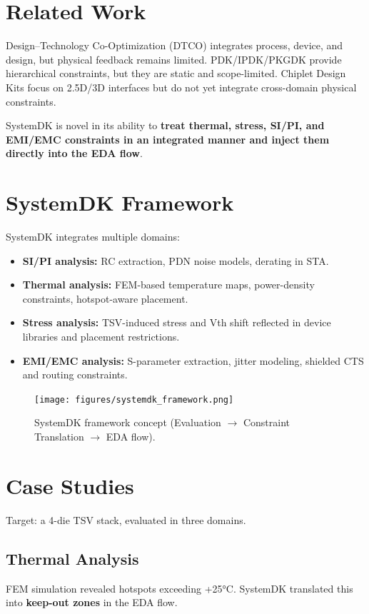 \documentclass[conference]{IEEEtran}
\begin{document}
\section{Related Work}
Design--Technology Co-Optimization (DTCO) integrates process, device, and design, but physical feedback remains limited.  
PDK/IPDK/PKGDK provide hierarchical constraints, but they are static and scope-limited.  
Chiplet Design Kits focus on 2.5D/3D interfaces but do not yet integrate cross-domain physical constraints.  

SystemDK is novel in its ability to \textbf{treat thermal, stress, SI/PI, and EMI/EMC constraints in an integrated manner and inject them directly into the EDA flow}.

\section{SystemDK Framework}
SystemDK integrates multiple domains:
\begin{itemize}
  \item \textbf{SI/PI analysis:} RC extraction, PDN noise models, derating in STA.
  \item \textbf{Thermal analysis:} FEM-based temperature maps, power-density constraints, hotspot-aware placement.
  \item \textbf{Stress analysis:} TSV-induced stress and Vth shift reflected in device libraries and placement restrictions.
  \item \textbf{EMI/EMC analysis:} S-parameter extraction, jitter modeling, shielded CTS and routing constraints.
\end{itemize}

\begin{figure}[htbp]
  \centering
  \texttt{[image: figures/systemdk\_framework.png]}
  \caption{SystemDK framework concept (Evaluation $\rightarrow$ Constraint Translation $\rightarrow$ EDA flow).}
  \label{fig:framework}
\end{figure}

\section{Case Studies}
Target: a 4-die TSV stack, evaluated in three domains.

\subsection{Thermal Analysis}
FEM simulation revealed hotspots exceeding +25°C.  
SystemDK translated this into \textbf{keep-out zones} in the EDA flow.
\end{document}
